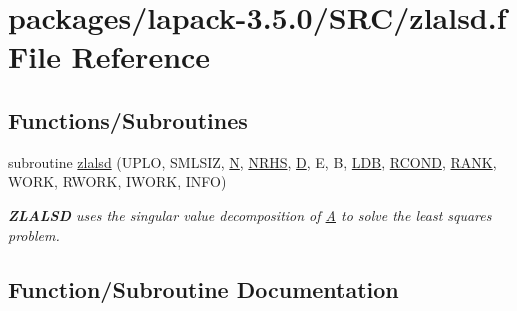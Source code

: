 \hypertarget{zlalsd_8f}{}\section{packages/lapack-\/3.5.0/\+S\+R\+C/zlalsd.f File Reference}
\label{zlalsd_8f}
\subsection*{Functions/\+Subroutines}
\begin{DoxyCompactItemize}
\item 
subroutine \hyperlink{zlalsd_8f_a469113fb08a70d0fa24940f949a04d6c}{zlalsd} (U\+P\+L\+O, S\+M\+L\+S\+I\+Z, \hyperlink{polmisc_8c_a0240ac851181b84ac374872dc5434ee4}{N}, \hyperlink{example__user_8c_aa0138da002ce2a90360df2f521eb3198}{N\+R\+H\+S}, \hyperlink{odrpack_8h_a7dae6ea403d00f3687f24a874e67d139}{D}, E, B, \hyperlink{example__user_8c_a50e90a7104df172b5a89a06c47fcca04}{L\+D\+B}, \hyperlink{superlu__enum__consts_8h_af00a42ecad444bbda75cde1b64bd7e72a9b5c151728d8512307565994c89919d5}{R\+C\+O\+N\+D}, \hyperlink{splinemodule_8c_a3a88bcc63386de30443dacede2e01847}{R\+A\+N\+K}, W\+O\+R\+K, R\+W\+O\+R\+K, I\+W\+O\+R\+K, I\+N\+F\+O)
\begin{DoxyCompactList}\small\item\em {\bfseries Z\+L\+A\+L\+S\+D} uses the singular value decomposition of \hyperlink{classA}{A} to solve the least squares problem. \end{DoxyCompactList}\end{DoxyCompactItemize}


\subsection{Function/\+Subroutine Documentation}
\hypertarget{zlalsd_8f_a469113fb08a70d0fa24940f949a04d6c}{}
